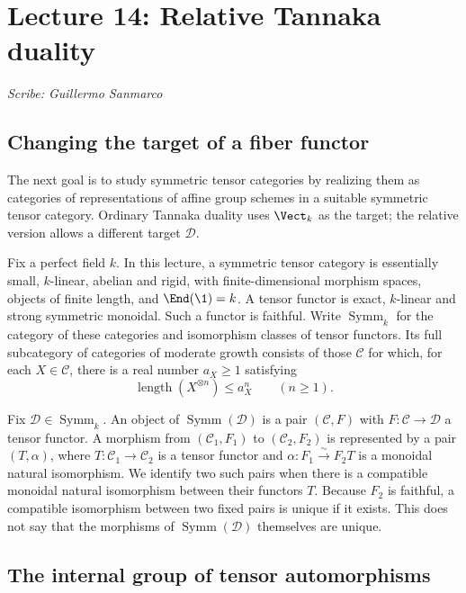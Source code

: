 \section{Lecture 14: Relative Tannaka duality}
\label{lec14}
\noindent\textit{Scribe: Guillermo Sanmarco}

\subsection{Changing the target of a fiber functor}

The next goal is to study symmetric tensor categories by realizing them as
categories of representations of affine group schemes in a suitable symmetric
tensor category. Ordinary Tannaka duality uses $\Vect_k$ as the target; the
relative version allows a different target $\mathcal D$.

Fix a perfect field $k$. In this lecture, a symmetric tensor category is
essentially small, $k$-linear, abelian and rigid, with finite-dimensional
morphism spaces, objects of finite length, and
$\End(\1)=k$. A tensor functor is exact, $k$-linear and strong symmetric
monoidal. Such a functor is faithful. Write $\operatorname{Symm}_k$ for the
category of these categories and isomorphism classes of tensor functors.
Its full subcategory of categories of moderate growth consists of those
$\mathcal C$ for which, for each $X\in\mathcal C$, there is a real number
$a_X\geq1$ satisfying
\[
 \operatorname{length}(X^{\otimes n})\leq a_X^n\qquad(n\geq1).
\]

Fix $\mathcal D\in\operatorname{Symm}_k$. An object of
$\operatorname{Symm}(\mathcal D)$ is a pair $(\mathcal C,F)$ with
$F:\mathcal C\to\mathcal D$ a tensor functor. A morphism from
$(\mathcal C_1,F_1)$ to $(\mathcal C_2,F_2)$ is represented by a pair
$(T,\alpha)$, where $T:\mathcal C_1\to\mathcal C_2$ is a tensor functor
and $\alpha:F_1\xrightarrow{\sim}F_2T$ is a monoidal natural isomorphism.
We identify two such pairs when there is a compatible monoidal natural
isomorphism between their functors $T$. Because $F_2$ is faithful, a
compatible isomorphism between two fixed pairs is unique if it exists.
This does not say that the morphisms of $\operatorname{Symm}(\mathcal D)$
themselves are unique.

\subsection{The internal group of tensor automorphisms}


